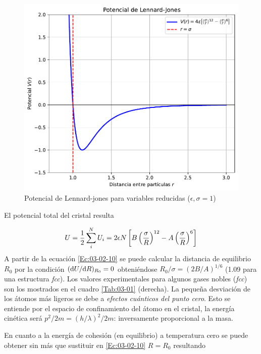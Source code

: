 \begin{figure}[h!] \centering
    \includegraphics[scale=1.05]{Cuerpo/Ch_03/Lennard-jones.pdf}
    \caption{Potencial de Lennard-jones para variables reducidas ($\epsilon,\sigma = 1$)}
    \label{Fig:03-03}
\end{figure}    

El potencial total del cristal resulta

\begin{equation}
    U = \frac{1}{2} \sum_i^N U_i = 2 \epsilon N \left[ B\left( \frac{\sigma}{R} \right)^{12}-A\left( \frac{\sigma}{R} \right)^6 \right] \label{Ec:03-02-10}
\end{equation}
A partir de la ecuación \ref{Ec:03-02-10} se puede calcular la distancia de equilibrio $R_0$ por la condición $(\mathrm{d} U / \mathrm{d} R)_{R_0} =0$ obteniéndose $R_0 / \sigma = (2B/A)^{1/6}$ (1.09 para una estructura \textit{fcc}). Los valores experimentales para algunos gases nobles (\textit{fcc}) son los mostrados en el cuadro  \ref{Tab:03-01} (derecha). La pequeña desviación de los átomos más ligeros se debe a \textit{efectos cuánticos del punto cero}. Esto se entiende por el espacio de confinamiento del átomo en el cristal, la energía cinética será $p^2/2m= (h/\lambda)^2/2m$: inversamente proporcional a la masa. 

En cuanto a la energía de cohesión (en equilibrio) a temperatura cero se puede obtener sin más que sustituir en \ref{Ec:03-02-10} $R=R_0$ resultando


